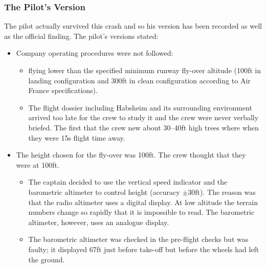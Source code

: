 



  \subsubsection*{The Pilot's Version}

The pilot actually survived this crash and so his version has been
recorded as well as the official finding. The pilot's versions stated:

\begin{itemize}

\item Company operating procedures were not followed:

  \begin{itemize}

  \item flying lower than the specified minimum runway fly-over altitude
  (100ft in landing configuration and 300ft in clean configuration
  according to Air France specifications).

  \item The flight dossier including Habsheim and its surrounding environment
  arrived too late for the crew to study it and the crew were never
  verbally briefed.  The first that the crew new about 30--40ft high
  trees where when they were 15s flight time away.

  \end{itemize}


\item The height chosen for the fly-over was 100ft.  The crew thought
that they were at 100ft.

  \begin{itemize}

  \item The captain decided to use the vertical speed indicator and the
  barometric altimeter to control height (accuracy \(\pm\)30ft).  The
  reason was that the radio altimeter uses a digital display.  At 
  low altitude the terrain numbers change so rapidly that it is
  impossible to read.  The barometric altimeter, however, uses an
  analogue display.

  \item The barometric altimeter was checked in the pre-flight checks
  but was faulty; it displayed 67ft just before take-off but before the
  wheels had left the ground.


\end{itemize}
\end{itemize}
